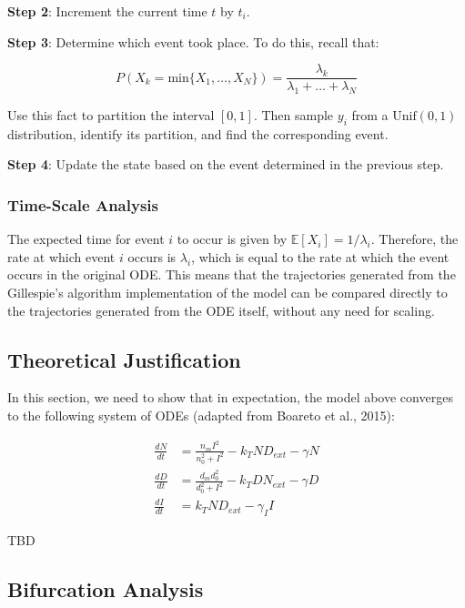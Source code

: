 \documentclass{article}
\begin{document}
\begin{flushleft}
\medskip

\textbf{Step 2}: Increment the current time $t$ by $t_{i}$.

\medskip

\textbf{Step 3}: Determine which event took place. To do this, recall that:

$$P(X_{k} = \text{min} \{  X_{1}, \dots, X_{N} \}) = \frac{\lambda_{k}}{\lambda_{1} + \dots + \lambda_{N}}$$

Use this fact to partition the interval $[0, 1]$. Then sample $y_{i}$ from a $\text{Unif}(0, 1)$ distribution, identify its partition, and find the corresponding event.

\medskip

\textbf{Step 4}: Update the state based on the event determined in the previous step.

\subsubsection{Time-Scale Analysis}
 
The expected time for event $i$ to occur is given by $\mathbb{E}[X_{i}] = 1/\lambda_{i}$. Therefore, the rate at which event $i$ occurs is $\lambda_{i}$, which is equal to the rate at which the event occurs in the original ODE. This means that the trajectories generated from the Gillespie's algorithm implementation of the model can be compared directly to the trajectories generated from the ODE itself, without any need for scaling.

\subsection{Theoretical Justification}

In this section, we need to show that in expectation, the model above converges to the following system of ODEs (adapted from Boareto et al., 2015):

$$
\begin{aligned}
  \frac{dN}{dt} &= \frac{n_{m}I^2}{n_{0}^2 + I^2} - k_{T}ND_{ext} - \gamma N \\[5pt]
  \frac{dD}{dt} &= \frac{d_{m}d_{0}^2}{d_{0}^2 + I^2} - k_{T}DN_{ext} - \gamma D \\[5pt]
  \frac{dI}{dt} &= k_{T}ND_{ext} - \gamma_{I}I
\end{aligned}
$$

TBD

\subsection{Bifurcation Analysis}


\end{flushleft}
\end{document}
